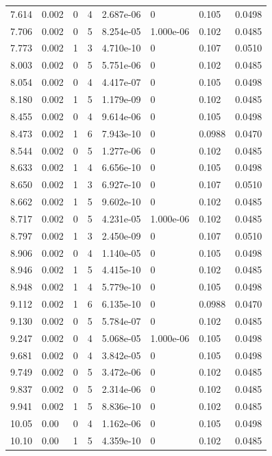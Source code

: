 \documentclass[preview]{standalone}
\begin{document}
{{{\begin{tabular}{L{1.2cm}C{1.2cm} C{0.3cm}C{0.5cm} C{1.4cm}C{1.4cm} C{1.4cm}C{1.4cm}}
  7.614  &  0.002  & 0     &  4 &  2.687e-06  & 0  & 0.105 &  0.0498   \\ 
  7.706  &  0.002  & 0     &  5 &  8.254e-05  & 1.000e-06  & 0.102 &  0.0485   \\ 
  7.773  &  0.002  & 1     &  3 &  4.710e-10  & 0  & 0.107 &  0.0510   \\ 
  8.003  &  0.002  & 0     &  5 &  5.751e-06  & 0  & 0.102 &  0.0485   \\ 
  8.054  &  0.002  & 0     &  4 &  4.417e-07  & 0  & 0.105 &  0.0498   \\ 
  8.180  &  0.002  & 1     &  5 &  1.179e-09  & 0  & 0.102 &  0.0485   \\ 
  8.455  &  0.002  & 0     &  4 &  9.614e-06  & 0  & 0.105 &  0.0498   \\ 
  8.473  &  0.002  & 1     &  6 &  7.943e-10  & 0  & 0.0988 &  0.0470   \\ 
  8.544  &  0.002  & 0     &  5 &  1.277e-06  & 0  & 0.102 &  0.0485   \\ 
  8.633  &  0.002  & 1     &  4 &  6.656e-10  & 0  & 0.105 &  0.0498   \\ 
  8.650  &  0.002  & 1     &  3 &  6.927e-10  & 0  & 0.107 &  0.0510   \\ 
  8.662  &  0.002  & 1     &  5 &  9.602e-10  & 0  & 0.102 &  0.0485   \\ 
  8.717  &  0.002  & 0     &  5 &  4.231e-05  & 1.000e-06  & 0.102 &  0.0485   \\ 
  8.797  &  0.002  & 1     &  3 &  2.450e-09  & 0  & 0.107 &  0.0510   \\ 
  8.906  &  0.002  & 0     &  4 &  1.140e-05  & 0  & 0.105 &  0.0498   \\ 
  8.946  &  0.002  & 1     &  5 &  4.415e-10  & 0  & 0.102 &  0.0485   \\ 
  8.948  &  0.002  & 1     &  4 &  5.779e-10  & 0  & 0.105 &  0.0498   \\ 
  9.112  &  0.002  & 1     &  6 &  6.135e-10  & 0  & 0.0988 &  0.0470   \\ 
  9.130  &  0.002  & 0     &  5 &  5.784e-07  & 0  & 0.102 &  0.0485   \\ 
  9.247  &  0.002  & 0     &  4 &  5.068e-05  & 1.000e-06  & 0.105 &  0.0498   \\ 
  9.681  &  0.002  & 0     &  4 &  3.842e-05  & 0  & 0.105 &  0.0498   \\ 
  9.749  &  0.002  & 0     &  5 &  3.472e-06  & 0  & 0.102 &  0.0485   \\ 
  9.837  &  0.002  & 0     &  5 &  2.314e-06  & 0  & 0.102 &  0.0485   \\ 
  9.941  &  0.002  & 1     &  5 &  8.836e-10  & 0  & 0.102 &  0.0485   \\ 
  10.05  &  0.00  & 0     &  4 &  1.162e-06  & 0  & 0.105 &  0.0498   \\ 
  10.10  &  0.00  & 1     &  5 &  4.359e-10  & 0  & 0.102 &  0.0485   \\ 
\hline 
\end{tabular} 

}}}
\end{document}
